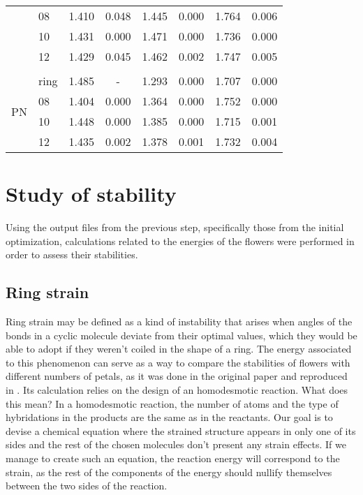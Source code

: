 \begin{table}
\begin{tabular}{@{}rlcccccc@{}}
        & 08 & 1.410 & 0.048 & 1.445 & 0.000 & 1.764 & 0.006 \\
        & 10 & 1.431 & 0.000 & 1.471 & 0.000 & 1.736 & 0.000 \\
        & 12 & 1.429 & 0.045 & 1.462 & 0.002 & 1.747 & 0.005 \\
        \\
        \multirow{4}{*}{PN} & ring & 1.485 & - & 1.293 & 0.000 & 1.707 & 0.000 \\
        & 08 & 1.404 & 0.000 & 1.364 & 0.000 & 1.752 & 0.000 \\
        & 10 & 1.448 & 0.000 & 1.385 & 0.000 & 1.715 & 0.001 \\
        & 12 & 1.435 & 0.002 & 1.378 & 0.001 & 1.732 & 0.004 \\
        \bottomrule
    \end{tabular}
\end{table}


\section{Study of stability}

Using the output files from the previous step, specifically those from the initial optimization, calculations related to the energies of the flowers were performed in order to assess their stabilities.

\subsection{Ring strain}
Ring strain may be defined as a kind of instability that arises when angles of the bonds in a cyclic molecule deviate from their optimal values, which they would be able to adopt if they weren't coiled in the shape of a ring.
The energy associated to this phenomenon can serve as a way to compare the stabilities of flowers with different numbers of petals, as it was done in the original paper and reproduced in .
Its calculation relies on the design of an homodesmotic reaction.
What does this mean?
In a homodesmotic reaction, the number of atoms and the type of hybridations in the products are the same as in the reactants.
Our goal is to devise a chemical equation where the strained structure appears in only one of its sides and the rest of the chosen molecules don't present any strain effects.
If we manage to create such an equation, the reaction energy will correspond to the strain, as the rest of the components of the energy should nullify themselves between the two sides of the reaction.

